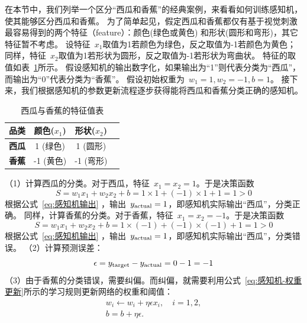 在本节中，我们列举一个区分“西瓜和香蕉”的经典案例，来看看如何训练感知机，使其能够区分西瓜和香蕉。
为了简单起见，假定西瓜和香蕉都仅有基于视觉刺激最容易得到的两个特征（feature）：颜色(绿色或黄色) 和形状(圆形和弯形)，其它特征暂不考虑。
设特征~$x_1$取值为1若颜色为绿色，反之取值为-1若颜色为黄色；同样，特征~$x_2$取值为1若形状为圆形，反之取值为-1若形状为弯曲状。 特征的取值如表~\ref{西瓜与香蕉的特征值表}所示。
假设感知机的输出数字化，如果输出为“1”则代表分类为“西瓜”，而输出为“0”代表分类为“香蕉”。
假设初始权重为~$w_1 =1, w_2 =-1, b =1$。
接下来，我们根据感知机的参数更新流程逐步获得能将西瓜和香蕉分类正确的感知机。
\begin{table}[htbp]
\centering
\caption{西瓜与香蕉的特征值表}
\begin{tabular}{|c|c|c|c|
}
\hline
{\bf 品类} & {\bf  颜色($x_1$) } & {\bf 形状($x_2$)}  \\
\hline
{\bf 西瓜} &  1 (绿色)  &  1 (圆形)   \\
\hline
{\bf 香蕉}  &  -1 (黄色) & -1 (弯形)  \\
\hline
\end{tabular}
\label{西瓜与香蕉的特征值表}
\end{table}
%
 （1）计算西瓜的分类。对于西瓜，特征~$x_1 =x_2=1$。于是决策函数
$$
S  = w_1 x_1 +w_2 x_2  +b   = 1\times 1 + (-1)\times 1 + 1 = 1 >0
$$
根据公式~\eqref{eq:感知机输出} ，输出~$y_{\rm actual}=1$，即感知机实际输出“西瓜”，分类正确。
同样，计算香蕉的分类。对于香蕉，特征~$x_1 =x_2=-1$。于是决策函数
$$
S  = w_1 x_1 +w_2 x_2  +b   = 1\times (-1) + (-1)\times (-1) + 1 = 1 >0
$$
根据公式~\eqref{eq:感知机输出} ，输出~$y_{\rm actual}=1$，即感知机实际输出“西瓜”，分类错误。
（2）计算预测误差：
$$ \epsilon = y_{\rm target}- y_{\rm actual}  =0 -1=-1 $$
（3）由于香蕉的分类错误，需要纠偏。而纠偏，就需要利用公式~\eqref{eq:感知机-权重更新}所示的学习规则更新网络的权重和阈值：
$$\begin{array}{l}
 w_i  \leftarrow w_i +\eta \epsilon x_i, \quad  i=1,2, \\
  b = b+\eta \epsilon .
\end{array}
$$
